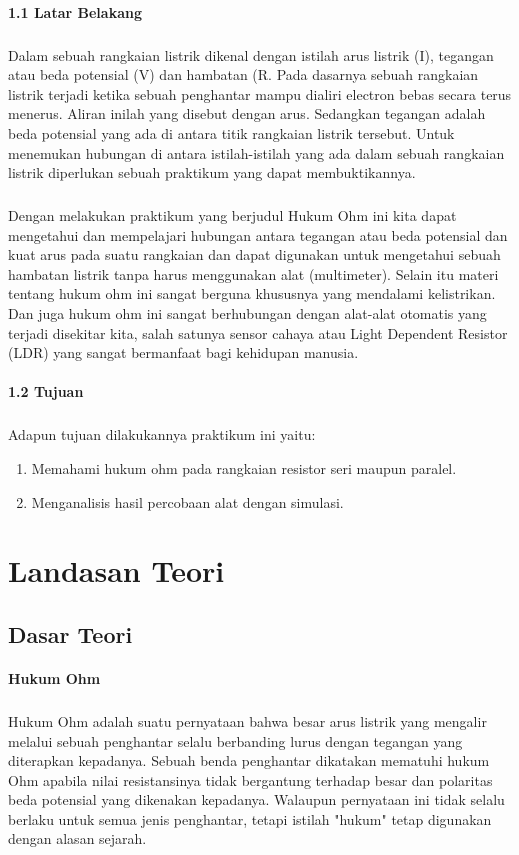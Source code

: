 \documentclass[12pt,a4paper]{article}
\begin{document}
\paragraph{1.1 Latar Belakang}
\subparagraph{ }
	Dalam sebuah rangkaian listrik dikenal dengan istilah arus listrik (I), tegangan atau beda potensial (V) dan hambatan (R. Pada dasarnya sebuah rangkaian listrik terjadi ketika sebuah penghantar mampu dialiri electron bebas secara terus menerus. Aliran inilah yang disebut dengan arus. Sedangkan tegangan adalah beda potensial yang ada di antara titik rangkaian listrik tersebut. Untuk menemukan hubungan di antara istilah-istilah yang ada dalam sebuah rangkaian listrik diperlukan sebuah praktikum yang dapat membuktikannya.
\subparagraph{ }
	Dengan melakukan praktikum yang berjudul Hukum Ohm ini kita dapat mengetahui dan mempelajari hubungan antara tegangan atau beda potensial dan kuat arus pada suatu rangkaian dan dapat digunakan untuk mengetahui sebuah hambatan listrik tanpa harus menggunakan alat (multimeter). Selain itu materi tentang hukum ohm ini sangat berguna khususnya yang mendalami kelistrikan. Dan juga hukum ohm ini sangat berhubungan dengan alat-alat otomatis yang terjadi disekitar kita, salah satunya sensor cahaya atau Light Dependent Resistor (LDR) yang sangat bermanfaat bagi kehidupan manusia.
 
 

\paragraph{1.2 Tujuan}
\subparagraph{ }
Adapun tujuan dilakukannya praktikum ini yaitu:
\begin{enumerate}
\item Memahami hukum ohm pada rangkaian resistor seri maupun paralel.
\item Menganalisis hasil percobaan alat dengan simulasi.
\end{enumerate}


\newpage
\section{Landasan Teori}
\subsection{Dasar Teori}
\paragraph{ }
\textbf{Hukum Ohm}
\subparagraph{ }
	Hukum Ohm adalah suatu pernyataan bahwa besar arus listrik yang mengalir melalui sebuah penghantar selalu berbanding lurus dengan tegangan yang diterapkan kepadanya. Sebuah benda penghantar dikatakan mematuhi hukum Ohm apabila nilai resistansinya tidak bergantung terhadap besar dan polaritas beda potensial yang dikenakan kepadanya. Walaupun pernyataan ini tidak selalu berlaku untuk semua jenis penghantar, tetapi istilah "hukum" tetap digunakan dengan alasan sejarah.
\end{document}
